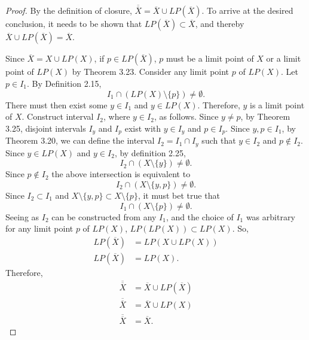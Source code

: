 \documentclass{amsart}
\newcommand{\1}{\mathds{1}}
\numberwithin{equation}{section}
\numberwithin{theorem}{section}
\begin{document}
\begin{proof}
	By the definition of closure, $\overline{\overline{X}} = \overline{X} \cup LP(\overline{X})$. To arrive at the desired conclusion, it needs to be shown that $LP(\overline{X})\subset \overline{X}$, and thereby $\overline{X} \cup LP(\overline{X}) = \overline{X}$. 
	
	Since $\overline{X} = X \cup LP(X)$, if $p\in LP(\overline{X})$, $p$ must be a limit point of $X$ or a limit point of $LP(X)$ by Theorem 3.23. Consider any limit point $p$ of $LP(X)$. Let $p\in I_1$. By Definition 2.15, $$I_1 \cap (LP(X)\setminus \{p\}) \not= \emptyset.$$ There must then exist some $y\in I_1$ and $y\in LP(X)$. Therefore, $y$ is a limit point of $X$. Construct interval $I_2$, where $y\in I_2$, as follows. Since $y\not=p$, by Theorem 3.25, disjoint intervals $I_y$ and $I_p$ exist with $y\in I_y$ and $p\in I_p$. Since $y,p\in I_1$, by Theorem 3.20, we can define the interval $I_2 = I_1 \cap I_y$ such that $y\in I_2$ and $p\notin I_2$. Since $y\in LP(X)$ and $y\in I_2$, by definition 2.25, $$I_2 \cap (X\setminus \{y\}) \not= \emptyset.$$ Since $p\notin I_2$ the above intersection is equivalent to $$I_2 \cap (X\setminus \{y,p\}) \not= \emptyset.$$ Since $I_2\subset I_1$ and $X\setminus \{y,p\} \subset X\setminus \{p\}$, it must bet true that $$I_1 \cap (X\setminus \{p\}) \not= \emptyset.$$ Seeing as $I_2$ can be constructed from any $I_1$, and the choice of $I_1$ was arbitrary for any limit point $p$ of $LP(X)$, $LP(LP(X))\subset LP(X)$. So, 
	\[\begin{split}
		LP(\overline{X}) &= LP(X\cup LP(X))\\
		LP(\overline{X}) &= LP(X).
	\end{split}\]
	Therefore,
	\[\begin{split}
		\overline{\overline{X}} &= \overline{X} \cup LP(\overline{X})\\
		\overline{\overline{X}} &= \overline{X} \cup LP(X)\\
		\overline{\overline{X}} &= \overline{X}.
	\end{split}\]
	
\end{proof}
\end{document}
